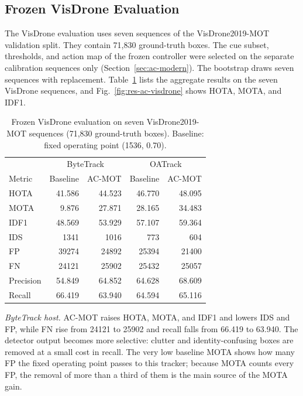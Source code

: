 \subsection{Frozen VisDrone Evaluation}\label{sec:res-ac-visdrone}
The VisDrone evaluation uses seven sequences of the VisDrone2019-MOT validation split. They contain 71,830 ground-truth boxes. The cue subset, thresholds, and action map of the frozen controller were selected on the separate calibration sequences only (Section~\ref{sec:ac-modern}). The bootstrap draws seven sequences with replacement. Table~\ref{tab:res-ac-visdrone} lists the aggregate results on the seven VisDrone sequences, and Fig.~\ref{fig:res-ac-visdrone} shows HOTA, MOTA, and IDF1.

\begin{table}[tbp]
\centering
\caption{Frozen VisDrone evaluation on seven VisDrone2019-MOT sequences (71,830 ground-truth boxes). Baseline: fixed operating point (1536, 0.70).}
\label{tab:res-ac-visdrone}
\begin{tabular}{lrrrr}
\toprule
 & \multicolumn{2}{c}{ByteTrack} & \multicolumn{2}{c}{OATrack}\\
Metric & Baseline & AC-MOT & Baseline & AC-MOT\\
\midrule
HOTA & 41.586 & 44.523 & 46.770 & 48.095\\
MOTA & 9.876 & 27.871 & 28.165 & 34.483\\
IDF1 & 48.569 & 53.929 & 57.107 & 59.364\\
IDS & 1341 & 1016 & 773 & 604\\
FP & 39274 & 24892 & 25394 & 21400\\
FN & 24121 & 25902 & 25432 & 25057\\
Precision & 54.849 & 64.852 & 64.628 & 68.609\\
Recall & 66.419 & 63.940 & 64.594 & 65.116\\
\bottomrule
\end{tabular}
\end{table}

\emph{ByteTrack host.} AC-MOT raises HOTA, MOTA, and IDF1 and lowers IDS and FP, while FN rise from 24121 to 25902 and recall falls from 66.419 to 63.940. The detector output becomes more selective: clutter and identity-confusing boxes are removed at a small cost in recall. The very low baseline MOTA shows how many FP the fixed operating point passes to this tracker; because MOTA counts every FP, the removal of more than a third of them is the main source of the MOTA gain.

